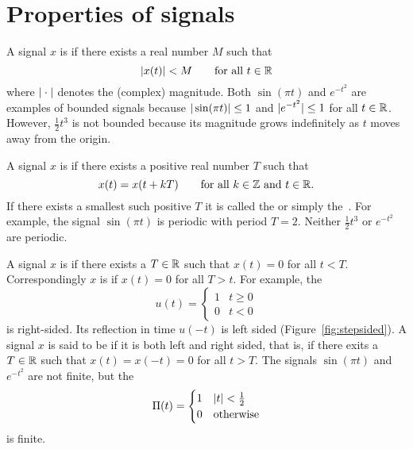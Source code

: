 \section{Properties of signals}\label{sec:properties-signals}

A signal $x$ is  if there exists a real number $M$ such that 
\[
\vert x(t) \vert < M \qquad \text{for all $t \in {\mathbb R}$} 
\]
where $\vert \cdot \vert$ denotes the (complex) magnitude.  Both $\sin( \pi t)$ and $e^{-t^2}$ are examples of bounded signals because $\vert \sin( \pi t) \vert \leq 1$ and $\vert e^{-t^2} \vert \leq 1$ for all $t \in {\mathbb R}$.  However, $\frac{1}{2}t^3$ is not bounded because its magnitude grows indefinitely as $t$ moves away from the origin.  %

A signal $x$ is  if there exists a positive real number $T$ such that
\[
x(t) = x(t + kT) \qquad \text{for all $k \in {\mathbb Z}$ and $t \in {\mathbb R}$.}
\]
If there exists a smallest such positive $T$ it is called the  or simply the~.  For example, the signal $\sin( \pi t)$ is periodic with period $T=2$.  Neither $\frac{1}{2}t^3$ or $e^{-t^2}$ are periodic.  %

A signal $x$ is  if there exists a $T \in {\mathbb R}$ such that $x(t) = 0$ for all $t < T$.  Correspondingly $x$ is  if $x(t) = 0$ for all $T > t$.  For example, the  
\begin{equation} \label{eq:stepfunction}
u(t) = \begin{cases}
1 & t \geq 0 \\
0 & t < 0
\end{cases}
\end{equation}
is right-sided.  Its reflection in time $u(-t)$ is left sided (Figure~\ref{fig:stepsided}).  A signal $x$ is said to be  if it is both left and right sided, that is, if there exits a $T\in{\mathbb R}$ such that $x(t) = x(-t) = 0$ for all $t > T$.  The signals $\sin( \pi t)$ and $e^{-t^2}$ are not finite, but the 
\begin{equation}\label{eq:rectfuncdefn}
\Pi(t) = \begin{cases} 
1 & \left\vert t \right\vert < \frac{1}{2}\\
0 & \text{otherwise}
\end{cases}
\end{equation}
is finite.  %

